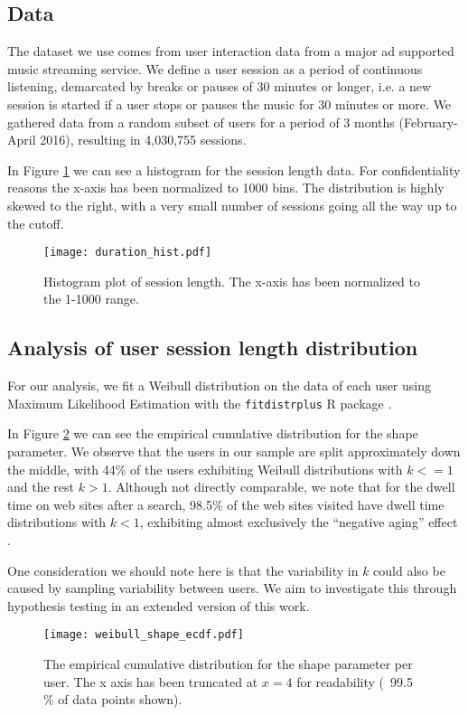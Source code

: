 \subsection{Data}

The dataset we use comes from user interaction data from a major ad supported
music streaming service.
We define a user session as a period of continuous listening, demarcated
by breaks or pauses of 30 minutes or longer, i.e. a new session is started 
if a user stops or pauses the music for 30 minutes or more.
We gathered data from a random subset of users for a period of 3 months (February-April 2016),
resulting in 4,030,755 sessions.

In Figure \ref{fig:duration-hist} we can see a histogram for the session length data. For
confidentiality reasons the x-axis has been normalized to 1000 bins.
The distribution is highly skewed to the right, with a very small number of sessions
going all the way up to the cutoff.


\begin{figure}
    \centering 
    \texttt{[image: duration\_hist.pdf]}
    \caption{Histogram plot of session length. The x-axis has been normalized to the 1-1000 range.}
    \label{fig:duration-hist}
\end{figure}

\subsection{Analysis of user session length distribution}

\label{subsec:weibull-analysis}

For our analysis, we fit a Weibull distribution on the data of each user using Maximum Likelihood
Estimation with the \texttt{fitdistrplus} R package \cite{delignette2015fitdistrplus}.

In Figure \ref{fig:shape-ecdf} we can see the empirical cumulative distribution for the
shape parameter. We observe that the users in our sample are split approximately
down the middle, with 44\% of the users exhibiting Weibull distributions with $k <= 1$ and the rest $k > 1$.
Although not directly comparable, we note that for the dwell time on web sites after a search, 98.5\%
of the web sites visited have dwell time distributions with $k < 1$, exhibiting
almost exclusively the ``negative aging'' effect \cite{liu2010weibull}.

One consideration we should note here is that the variability in $k$ could also be caused by sampling
variability between users. We aim to investigate this through hypothesis testing in
an extended version of this work.

\begin{figure}
	\centering
	\texttt{[image: weibull\_shape\_ecdf.pdf]}
	\caption{The empirical cumulative distribution for the shape parameter per user.
		The x axis has been truncated at $x=4$ for readability (~99.5 \% of data points shown).}
	\label{fig:shape-ecdf}
\end{figure}

